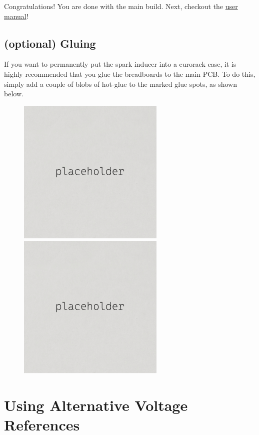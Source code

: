\documentclass[12pt, a4paper]{article}
\begin{document}
Congratulations! You are done with the main build. Next, checkout the
\href{https://protorack.de/modules/spark-inducer/manual}{user manual}!

\pagebreak
\subsection{\smaller (optional) \enspace \larger Gluing}
\label{ssec:gluing}

If you want to permanently put the spark inducer into a eurorack case, it is highly recommended
that you glue the breadboards to the main PCB. To do this, simply add a couple of blobs of
hot-glue to the marked glue spots, as shown below.

\begin{figure}[H]
    \centering
    \includegraphics[width=7cm]{images/placeholder.jpg}
    \hspace{2mm}
    \includegraphics[width=7cm]{images/placeholder.jpg}
\end{figure}

\pagebreak
\section*{Using Alternative Voltage References}
\end{document}

